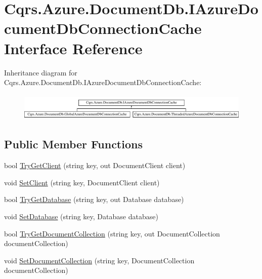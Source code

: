 \hypertarget{interfaceCqrs_1_1Azure_1_1DocumentDb_1_1IAzureDocumentDbConnectionCache}{}\section{Cqrs.\+Azure.\+Document\+Db.\+I\+Azure\+Document\+Db\+Connection\+Cache Interface Reference}
\label{interfaceCqrs_1_1Azure_1_1DocumentDb_1_1IAzureDocumentDbConnectionCache}
Inheritance diagram for Cqrs.\+Azure.\+Document\+Db.\+I\+Azure\+Document\+Db\+Connection\+Cache\+:\begin{figure}[H]
\begin{center}
\leavevmode
\includegraphics[height=1.317647cm]{interfaceCqrs_1_1Azure_1_1DocumentDb_1_1IAzureDocumentDbConnectionCache}
\end{center}
\end{figure}
\subsection*{Public Member Functions}
\begin{DoxyCompactItemize}
\item 
bool \hyperlink{interfaceCqrs_1_1Azure_1_1DocumentDb_1_1IAzureDocumentDbConnectionCache_a56a01a4224cb64d9349913e5237cebda_a56a01a4224cb64d9349913e5237cebda}{Try\+Get\+Client} (string key, out Document\+Client client)
\item 
void \hyperlink{interfaceCqrs_1_1Azure_1_1DocumentDb_1_1IAzureDocumentDbConnectionCache_a38d813e12b632a93a2934e2b1252f409_a38d813e12b632a93a2934e2b1252f409}{Set\+Client} (string key, Document\+Client client)
\item 
bool \hyperlink{interfaceCqrs_1_1Azure_1_1DocumentDb_1_1IAzureDocumentDbConnectionCache_ac2ab3e4a1c093f10d0b55634d4990ab2_ac2ab3e4a1c093f10d0b55634d4990ab2}{Try\+Get\+Database} (string key, out Database database)
\item 
void \hyperlink{interfaceCqrs_1_1Azure_1_1DocumentDb_1_1IAzureDocumentDbConnectionCache_a9242c99ffb76f8ad9b15cab617056bf0_a9242c99ffb76f8ad9b15cab617056bf0}{Set\+Database} (string key, Database database)
\item 
bool \hyperlink{interfaceCqrs_1_1Azure_1_1DocumentDb_1_1IAzureDocumentDbConnectionCache_af74bf6c8dc009e0179edc20ef3158f03_af74bf6c8dc009e0179edc20ef3158f03}{Try\+Get\+Document\+Collection} (string key, out Document\+Collection document\+Collection)
\item 
void \hyperlink{interfaceCqrs_1_1Azure_1_1DocumentDb_1_1IAzureDocumentDbConnectionCache_a6f5dab93f2ebee2503eb808b9031777d_a6f5dab93f2ebee2503eb808b9031777d}{Set\+Document\+Collection} (string key, Document\+Collection document\+Collection)
\end{DoxyCompactItemize}


